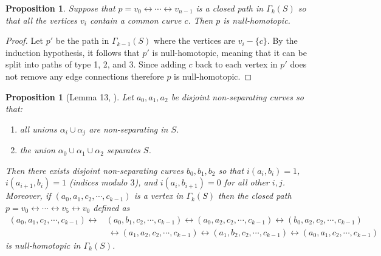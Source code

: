 \documentclass[11pt]{article}
\def\lr{\leftrightarrow}
\def\a{\alpha}
\newtheorem{proposition}[theorem]{Proposition}
\begin{document}
\begin{proposition}\label{prop:sp-radius-0}
  Suppose that $p = v_0 \lr \cdots \lr v_{n-1}$ is a closed path in $\Gamma_k(S)$ so that all the vertices $v_i$ contain a common curve $c$. Then $p$ is null-homotopic.
\end{proposition}
\begin{proof}
  Let $p'$ be the path in $\Gamma_{k-1}(S)$ where the vertices are $v_i- \{c\}$. By the induction hypothesis, it follows that $p'$ is null-homotopic, meaning that it can be split into paths of type 1, 2, and 3. Since adding $c$ back to each vertex in $p'$ does not remove any edge connections therefore $p$ is null-homotopic.
\end{proof}
\begin{proposition}[Lemma 13, \cite{wajnryb}]\label{prop:hex-path}
  Let $a_0, a_1, a_2$ be disjoint non-separating curves so that:
  \begin{enumerate}
    \item all unions $\a_i\cup \a_j$ are non-separating in $S$.
    \item the union $\a_0\cup \a_1\cup \a_2$ separates $S$.
  \end{enumerate}
  Then there exists disjoint non-separating curves $b_0, b_1, b_2$ so that $i(a_i,b_i) = 1$, $i(a_{i+1}, b_{i}) = 1$ (indices modulo $3$), and $i(a_i, b_{i+1}) = 0$ for all other $i,j$. Moreover, if $(a_0,a_1,c_2,\cdots, c_{k-1})$ is a vertex in $\Gamma_k(S)$ then the closed path $p = v_0 \lr \cdots \lr v_5 \lr v_0$ defined as
  \begin{align*}
    (a_0, a_1, c_2,\cdots, c_{k-1})\lr &(a_0, b_1,c_2,\cdots, c_{k-1}) \lr (a_0, a_2,c_2,\cdots, c_{k-1}) \lr (b_0, a_2,c_2,\cdots, c_{k-1})\\ 
    &\ \lr (a_1,a_2,c_2,\cdots, c_{k-1})\lr (a_1, b_2,c_2,\cdots, c_{k-1})\lr (a_0, a_1,c_2,\cdots, c_{k-1})
  \end{align*}
  is null-homotopic in $\Gamma_k(S)$.
\end{proposition}
\end{document}

